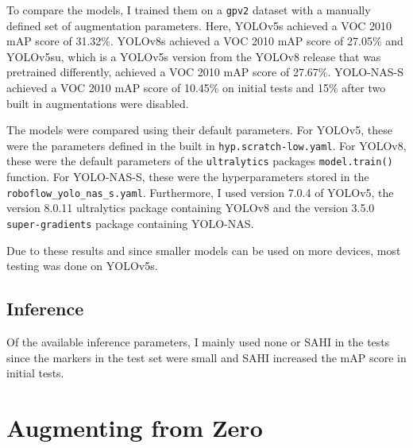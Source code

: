 \documentclass[10pt]{book}
\begin{document}
To compare the models, I trained them on a \texttt{gpv2} dataset with a manually defined set of augmentation parameters. Here, \ac{YOLO}v5s achieved a VOC 2010 \ac{mAP} score of 31.32\%. \ac{YOLO}v8s achieved a VOC 2010 \ac{mAP} score of 27.05\% and \ac{YOLO}v5su, which is a \ac{YOLO}v5s version from the \ac{YOLO}v8 release that was pretrained differently, achieved a VOC 2010 \ac{mAP} score of 27.67\%. \ac{YOLO}-NAS-S achieved a VOC 2010 \ac{mAP} score of 10.45\% on initial tests and 15\% after two built in augmentations were disabled.

The models were compared using their default parameters. For \ac{YOLO}v5, these were the parameters defined in the built in \texttt{hyp.scratch-low.yaml}. For \ac{YOLO}v8, these were the default parameters of the \texttt{ultralytics} packages \texttt{model.train()} function. For \ac{YOLO}-NAS-S, these were the hyperparameters stored in the \texttt{roboflow\_yolo\_nas\_s.yaml}. Furthermore, I used version 7.0.4 of \ac{YOLO}v5, the version 8.0.11 ultralytics package containing \ac{YOLO}v8 and the version 3.5.0 \texttt{super-gradients} package containing \ac{YOLO}-NAS.


Due to these results and since smaller models can be used on more devices, most testing was done on \ac{YOLO}v5s.

\subsection{Inference}

Of the available inference parameters, I mainly used none or \ac{SAHI} in the tests since the markers in the test set were small and \ac{SAHI} increased the \ac{mAP} score in initial tests.

\section{Augmenting from Zero} %
\label{sec:aug_ens_zero}
\end{document}
